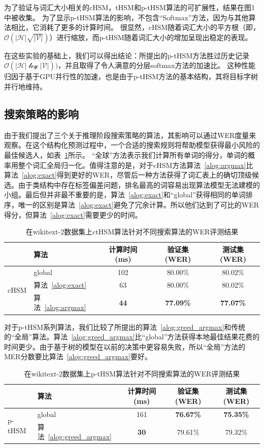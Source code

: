 为了验证与词汇大小相关的cHSM，tHSM和p-tHSM算法的可扩展性，结果在图1中被收集。 为了显示p-tHSM算法的影响，不包含“Softmax”方法，因为与其他算法相比，它消耗了更多的计算时间。 很显然，cHSM随着词汇大小的平方根（即，$ \mathcal{O(| H | \sqrt{| V |})} $）进行缩放，而p-tHSM随着词汇大小的增加呈现出稳定的表现。

在这些实验的基础上，我们可以得出结论：所提出的p-tHSM方法胜过历史记录$ \mathcal{O(| H | \log| V |)})$，并且取得了令人满意的分层softmax方法的加速比。 这种性能归因于基于GPU并行性的加速，也是由于p-tHSM方法的基本结构，其将目标字树并行地维持。



\subsection{搜索策略的影响}
由于我们提出了三个关于推理阶段搜索策略的算法，其影响可以通过WER度量来观察。在这个结构化预测过程中，一个合适的搜索规则将帮助模型获得最小风险的最佳候选人，如表~\ref{tab:search}所示。 “全球”方法表示我们计算所有单词的得分，单词的概率用整个词汇全局归一化。值得注意的是，对于cHSM方法算法~\ref{alog:argmax}比算法~\ref{alog:exact}得到更好的WER，尽管后一种方法获得了词汇表上的确切顶级候选。由于类结构中存在标签偏差问题，排名最高的词容易出现算法模型无法建模的小组。最后但并非最不重要的是，算法~\ref{alog:exact}和``global''获得相同的单词排序，唯一的区别是算法~\ref{alog:exact}避免了冗余计算。所以他们达到了可比的WER得分，但算法~\ref{alog:exact}需要更少的时间。
\begin{table}[!ht]
  \centering
  \caption{在wikitext-2数据集上ctHSM算法针对不同搜索算法的WER评测结果\label{tab:search}}
\begin{tabular}{llccc}
  \toprule
   & 算法&计算时间 (ms)&验证集 (WER)& 测试集(WER)\\ \midrule
  \multirow{3}{*}{cHSM} &global&102& 80.00\%& 80.02\%\\
        &算法~\ref{alog:exact}&63& 80.00\%& 80.02\%\\
        &算法~\ref{alog:argmax}&\textbf{44}&\textbf{ 77.09\%}&\textbf{ 77.07\%}\\
  \bottomrule
\end{tabular}
\end{table}


对于p-tHSM系列算法，我们比较了所提出的算法~\ref{alog:greed_argmax}和传统的“全局”算法。算法~\ref{alog:greed_argmax}比“global”方法获得本地最佳结果花费的时间更少。由于基于树的模型在以前的决策中更容易失败，所以“全局”方法的MER分数要比算法~\ref{alog:greed_argmax}要好。
\begin{table}[!ht]
  \centering
  \caption{在wikitext-2数据集上p-tHSM算法针对不同搜索算法的WER评测结果\label{tab:psearch2}}
\begin{tabular}{llccc}
  \toprule
        & 算法&计算时间 (ms)&验证集 (WER)& 测试集(WER)\\ \midrule
  \multirow{2}{*}{p-tHSM}  &global&161& \textbf{76.67\%}&\textbf{75.35\%}\\
        &算法~\ref{alog:greed_argmax}&\textbf{30} & 79.61\%&79.32\%\\
  \bottomrule
\end{tabular}
\end{table}


